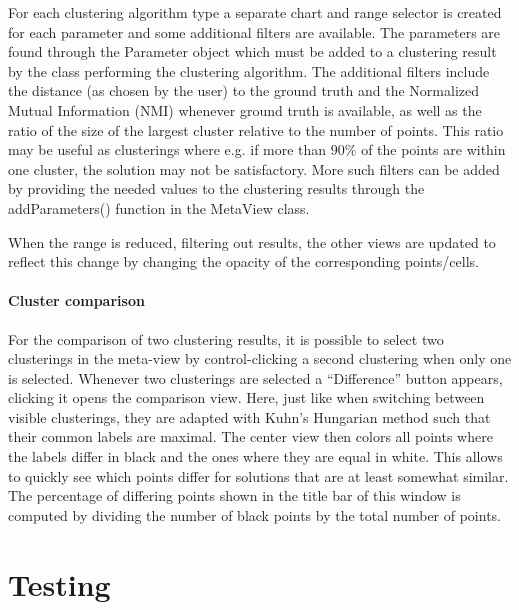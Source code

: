 \documentclass[
	a4paper,
	english,
	twoside,
	openright,               
	11pt                            
	]{report}
\begin{document}
For each clustering algorithm type a separate chart and range selector is created for each parameter and some additional filters are available. The parameters are found through the Parameter object which must be added to a clustering result by the class performing the clustering algorithm. The additional filters include the distance (as chosen by the user) to the ground truth and the Normalized Mutual Information (NMI) \cite{10.5555/1756006.1953024} whenever ground truth is available, as well as the ratio of the size of the largest cluster relative to the number of points. This ratio may be useful as clusterings where e.g. if more than $90\%$ of the points are within one cluster, the solution may not be satisfactory. More such filters can be added by providing the needed values to the clustering results through the addParameters() function in the MetaView class.

When the range is reduced, filtering out results, the other views are updated to reflect this change by changing the opacity of the corresponding points/cells.

\subsection{Cluster comparison}

For the comparison of two clustering results, it is possible to select two clusterings in the meta-view by control-clicking a second clustering when only one is selected. Whenever two clusterings are selected a ``Difference'' button appears, clicking it opens the comparison view. Here, just like when switching between visible clusterings, they are adapted with Kuhn’s Hungarian method \cite{Kuhn2010} such that their common labels are maximal. The center view then colors all points where the labels differ in black and the ones where they are equal in white. This allows to quickly see which points differ for solutions that are at least somewhat similar. The percentage of differing points shown in the title bar of this window is computed by dividing the number of black points by the total number of points.

\part{Testing}
\end{document}
